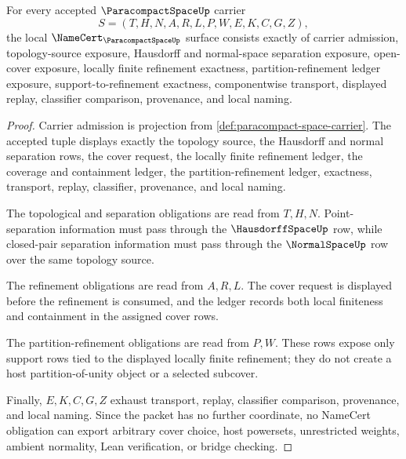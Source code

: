 \begin{theorem}
\label{thm:paracompact-space-namecert-obligations}
For every accepted $\ParacompactSpaceUp$ carrier
$$
S=(T,H,N,A,R,L,P,W,E,K,C,G,Z),
$$
the local $\NameCert_{\ParacompactSpaceUp}$ surface consists exactly of carrier admission, topology-source exposure, Hausdorff and normal-space separation exposure, open-cover exposure, locally finite refinement exactness, partition-refinement ledger exposure, support-to-refinement exactness, componentwise transport, displayed replay, classifier comparison, provenance, and local naming.
\end{theorem}
\begin{proof}
Carrier admission is projection from \autoref{def:paracompact-space-carrier}. The accepted tuple displays exactly the topology source, the Hausdorff and normal separation rows, the cover request, the locally finite refinement ledger, the coverage and containment ledger, the partition-refinement ledger, exactness, transport, replay, classifier, provenance, and local naming.

The topological and separation obligations are read from $T,H,N$. Point-separation information must pass through the $\HausdorffSpaceUp$ row, while closed-pair separation information must pass through the $\NormalSpaceUp$ row over the same topology source.

The refinement obligations are read from $A,R,L$. The cover request is displayed before the refinement is consumed, and the ledger records both local finiteness and containment in the assigned cover rows.

The partition-refinement obligations are read from $P,W$. These rows expose only support rows tied to the displayed locally finite refinement; they do not create a host partition-of-unity object or a selected subcover.

Finally, $E,K,C,G,Z$ exhaust transport, replay, classifier comparison, provenance, and local naming. Since the packet has no further coordinate, no NameCert obligation can export arbitrary cover choice, host powersets, unrestricted weights, ambient normality, Lean verification, or bridge checking.
\end{proof}

